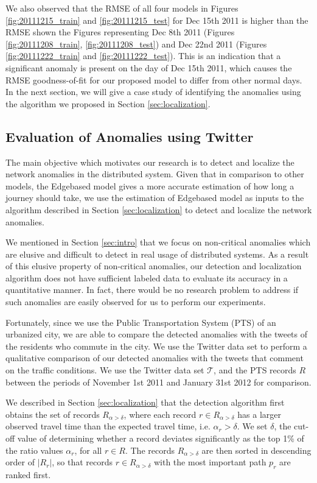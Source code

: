 \documentclass[conference]{IEEEtran.1.8}
\begin{document}
We also observed that the RMSE of all four models in Figures \ref{fig:20111215_train} and \ref{fig:20111215_test} for Dec 15th 2011 is higher than the RMSE shown the Figures representing Dec 8th 2011 (Figures \ref{fig:20111208_train}, \ref{fig:20111208_test}) and Dec 22nd 2011 (Figures \ref{fig:20111222_train} and \ref{fig:20111222_test}). This is an indication that a significant anomaly is present on the day of Dec 15th 2011, which causes the RMSE goodness-of-fit for our proposed model to differ from other normal days. In the next section, we will give a case study of identifying the anomalies using the algorithm we proposed in Section \ref{sec:localization}.

\subsection{Evaluation of Anomalies using Twitter}

The main objective which motivates our research is to detect and localize the network anomalies in the distributed system. Given that in comparison to other models, the Edgebased model gives a more accurate estimation of how long a journey should take, we use the estimation of Edgebased model as inputs to the algorithm described in Section \ref{sec:localization} to detect and localize the network anomalies.

We mentioned in Section \ref{sec:intro} that we focus on non-critical anomalies which are elusive and difficult to detect in real usage of distributed systems. As a result of this elusive property of non-critical anomalies, our detection and localization algorithm does not have sufficient labeled data to evaluate its accuracy in a quantitative manner. In fact, there would be no research problem to address if such anomalies are easily observed for us to perform our experiments.

Fortunately, since we use the Public Transportation System (PTS) of an urbanized city, we are able to compare the detected anomalies with the tweets of the residents who commute in the city. We use the Twitter data set %
to perform a qualitative comparison of our detected anomalies with the tweets that comment on the traffic conditions. We use the Twitter data set $\mathcal{T}$, and the PTS records $R$ between the periods of November 1st 2011 and January 31st 2012 for comparison.

We described in Section \ref{sec:localization} that the detection algorithm first obtains the set of records $R_{\alpha > \delta}$, where each record $r \in R_{\alpha > \delta}$ has a larger observed travel time than the expected travel time, i.e. $\alpha_r > \delta$. We set $\delta$, the cut-off value of determining whether a record deviates significantly as the top 1\% of the ratio values $\alpha_r$, for all $r \in R$. The records $R_{\alpha > \delta}$ are then sorted in descending order of $|R_r|$, so that records $r \in R_{\alpha > \delta}$ with the most important path $p_r$ are ranked first. 
\end{document}
